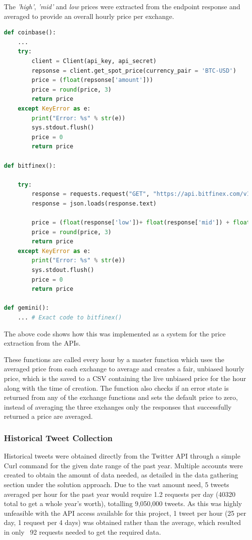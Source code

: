 \documentclass[oneside, 12pt]{article}
\begin{document}
			The \textit{'high'}, \textit{'mid'} and \textit{low} prices were extracted from the endpoint response and averaged to provide an overall hourly price per exchange.
			
			\begin{lstlisting}[language=Python, caption=Extraction of Price from exchanges]				
def coinbase():
	...				
	try:
		client = Client(api_key, api_secret)
		repsonse = client.get_spot_price(currency_pair = 'BTC-USD')
		price = (float(repsonse['amount']))
		price = round(price, 3)
		return price
	except KeyError as e:
		print("Error: %s" % str(e))
		sys.stdout.flush()
		price = 0
		return price
				
def bitfinex():
				
	try:
		response = requests.request("GET", "https://api.bitfinex.com/v1/pubticker/btcusd")
		response = json.loads(response.text)
				
		price = (float(response['low'])+ float(response['mid']) + float(response['high']))/3
		price = round(price, 3)
		return price
	except KeyError as e:
		print("Error: %s" % str(e))
		sys.stdout.flush()
		price = 0
		return price
				
def gemini():
	... # Exact code to bitfinex()
			\end{lstlisting}
			
			The above code shows how this was implemented as a system for the price extraction from the APIs.
			
			These functions are called every hour by a master function which uses the averaged price from each exchange to average and creates a fair, unbiased hourly price, which is the saved to a CSV containing the live unbiased price for the hour along with the time of creation. The function also checks if an error state is returned from any of the exchange functions and sets the default price to zero, instead of averaging the three exchanges only the responses that successfully returned a price are averaged.
					
			
			\subsubsection{Historical Tweet Collection}
			Historical tweets were obtained directly from the Twitter API through a simple Curl command for the given date range of the past year. Multiple accounts were created to obtain the amount of data needed, as detailed in the data gathering section under the solution approach. Due to the vast amount need, 5 tweets averaged per hour for the past year would require 1.2 requests per day (40320 total to get a whole year's worth), totalling 9,050,000 tweets. As this was highly unfeasible with the API access available for this project, 1 tweet per hour (25 per day, 1 request per 4 days) was obtained rather than the average, which resulted in only ~92 requests needed to get the required data. 
			
\end{document}

